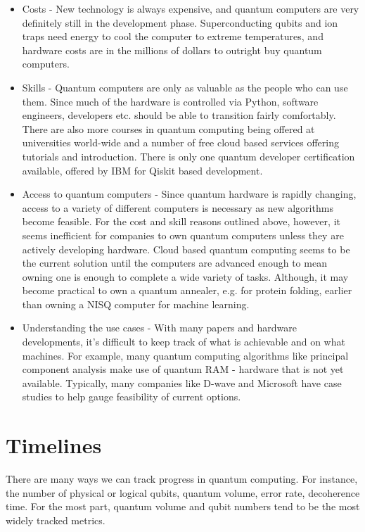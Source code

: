 \documentclass{article}
\theoremstyle{definition}
\begin{document}
\begin{itemize}
    \item Costs - New technology is always expensive, and quantum computers are very definitely still in the development phase. Superconducting qubits and ion traps need energy to cool the computer to extreme temperatures, and hardware costs are in the millions of dollars to outright buy quantum computers. 
    \item Skills - Quantum computers are only as valuable as the people who can use them. Since much of the hardware is controlled via Python, software engineers, developers etc. should be able to transition fairly comfortably. There are also more courses in quantum computing being offered at universities world-wide and a number of free cloud based services offering tutorials and introduction. There is only one quantum developer certification available, offered by IBM for Qiskit based development.
    \item Access to quantum computers - Since quantum hardware is rapidly changing, access to a variety of different computers is necessary as new algorithms become feasible. For the cost and skill reasons outlined above, however, it seems inefficient for companies to own quantum computers unless they are actively developing hardware. Cloud based quantum computing seems to be the current solution until the computers are advanced enough to mean owning one is enough to complete a wide variety of tasks. Although, it may become practical to own a quantum annealer, e.g. for protein folding, earlier than owning a NISQ computer for machine learning. 
    \item Understanding the use cases - With many papers and hardware developments, it's difficult to keep track of what is achievable and on what machines. For example, many quantum computing algorithms like principal component analysis make use of quantum RAM - hardware that is not yet available. Typically, many companies like D-wave and Microsoft have case studies to help gauge feasibility of current options. 
    \end{itemize}

\section{Timelines}
There are many ways we can track progress in quantum computing. For instance, the number of physical or logical qubits, quantum volume, error rate, decoherence time. For the most part, quantum volume and qubit numbers tend to be the most widely tracked metrics. 
\end{document}
